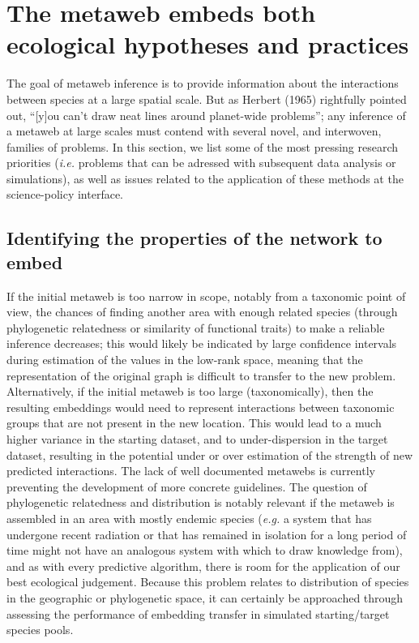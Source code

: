 \documentclass[10pt,oneside]{article}
\begin{document}
\hypertarget{the-metaweb-embeds-both-ecological-hypotheses-and-practices}{%
\section{The metaweb embeds both ecological hypotheses and
practices}\label{the-metaweb-embeds-both-ecological-hypotheses-and-practices}}

The goal of metaweb inference is to provide information about the
interactions between species at a large spatial scale. But as Herbert
(1965) rightfully pointed out, ``{[}y{]}ou can't draw neat lines around
planet-wide problems''; any inference of a metaweb at large scales must
contend with several novel, and interwoven, families of problems. In
this section, we list some of the most pressing research priorities
(\emph{i.e.} problems that can be adressed with subsequent data analysis
or simulations), as well as issues related to the application of these
methods at the science-policy interface.

\hypertarget{identifying-the-properties-of-the-network-to-embed}{%
\subsection{Identifying the properties of the network to
embed}\label{identifying-the-properties-of-the-network-to-embed}}

If the initial metaweb is too narrow in scope, notably from a taxonomic
point of view, the chances of finding another area with enough related
species (through phylogenetic relatedness or similarity of functional
traits) to make a reliable inference decreases; this would likely be
indicated by large confidence intervals during estimation of the values
in the low-rank space, meaning that the representation of the original
graph is difficult to transfer to the new problem. Alternatively, if the
initial metaweb is too large (taxonomically), then the resulting
embeddings would need to represent interactions between taxonomic groups
that are not present in the new location. This would lead to a much
higher variance in the starting dataset, and to under-dispersion in the
target dataset, resulting in the potential under or over estimation of
the strength of new predicted interactions. The lack of well documented
metawebs is currently preventing the development of more concrete
guidelines. The question of phylogenetic relatedness and distribution is
notably relevant if the metaweb is assembled in an area with mostly
endemic species (\emph{e.g.} a system that has undergone recent
radiation or that has remained in isolation for a long period of time
might not have an analogous system with which to draw knowledge from),
and as with every predictive algorithm, there is room for the
application of our best ecological judgement. Because this problem
relates to distribution of species in the geographic or phylogenetic
space, it can certainly be approached through assessing the performance
of embedding transfer in simulated starting/target species pools.
\end{document}
